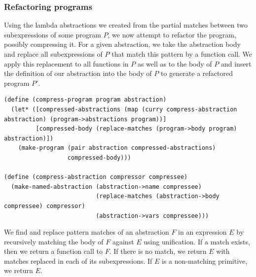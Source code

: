 \documentclass[a4paper,10pt]{article}
\begin{document}
\subsubsection{Refactoring programs}
Using the lambda abstractions we created from the partial matches between two subexpressions of some program $P$, we now attempt to refactor the program, possibly compressing it. For a given abstraction, we take the abstraction body and replace all subexpressions of $P$ that match this pattern by a function call.  We apply this replacement to all functions in $P$ as well as to the body of $P$ and insert the definition of our abstraction into the body of $P$ to generate a refactored program $P'$.

\begin{lstlisting}[frame=trbl]
(define (compress-program program abstraction)
  (let* ([compressed-abstractions (map (curry compress-abstraction abstraction) (program->abstractions program))]
         [compressed-body (replace-matches (program->body program) abstraction)])
    (make-program (pair abstraction compressed-abstractions)
                  compressed-body)))

(define (compress-abstraction compressor compressee)
  (make-named-abstraction (abstraction->name compressee)
                          (replace-matches (abstraction->body compressee) compressor)
                          (abstraction->vars compressee)))                           
\end{lstlisting}
We find and replace pattern matches of an abstraction $F$ in an expression $E$ by recursively matching the body of $F$ against $E$ using unification. If a match exists, then we return a function call to $F$. If there is no match, we return $E$ with matches replaced in each of its subexpressions. If $E$ is a non-matching primitive, we return $E$.
\end{document}
